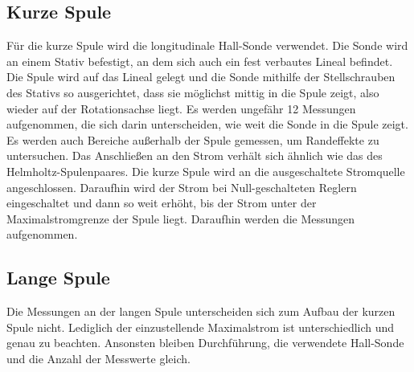 \subsection{Kurze Spule}
Für die kurze Spule wird die longitudinale Hall-Sonde verwendet. Die Sonde wird an einem Stativ befestigt, an dem sich auch ein fest verbautes Lineal befindet.
Die Spule wird auf das Lineal gelegt und die Sonde mithilfe der Stellschrauben des Stativs so ausgerichtet, dass sie möglichst mittig in die Spule zeigt, also wieder auf der Rotationsachse liegt.
Es werden ungefähr 12 Messungen aufgenommen, die sich darin unterscheiden, wie weit die Sonde in die Spule zeigt. Es werden auch Bereiche außerhalb der Spule gemessen, 
um Randeffekte zu untersuchen.
Das Anschließen an den Strom verhält sich ähnlich wie das des Helmholtz-Spulenpaares. Die kurze Spule wird an die ausgeschaltete Stromquelle angeschlossen. Daraufhin wird der Strom bei Null-geschalteten
Reglern eingeschaltet und dann so weit erhöht, bis der Strom unter der Maximalstromgrenze der Spule liegt.
Daraufhin werden die Messungen aufgenommen.

\subsection{Lange Spule}
Die Messungen an der langen Spule unterscheiden sich zum Aufbau der kurzen Spule nicht. Lediglich der einzustellende Maximalstrom ist unterschiedlich und genau zu beachten.
Ansonsten bleiben Durchführung, die verwendete Hall-Sonde und die Anzahl der Messwerte gleich.

